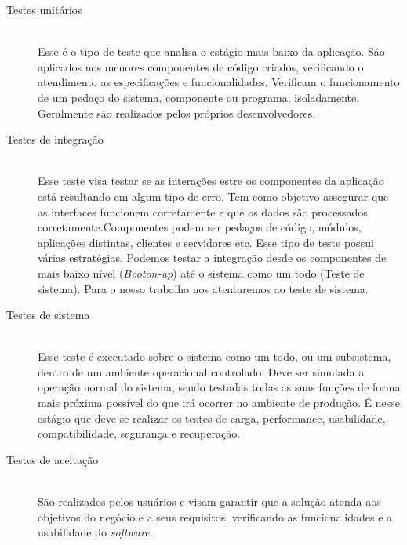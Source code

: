 \begin{description}
\item[Testes unitários] \hfill \\

Esse é o tipo de teste que analisa o estágio mais baixo da aplicação. São aplicados nos menores componentes de código criados, verificando o atendimento as especificações e funcionalidades. Verificam o funcionamento de um pedaço do sistema, componente ou programa,  isoladamente. Geralmente são realizados pelos próprios desenvolvedores.

\item[Testes de integração] \hfill \\

Esse teste visa testar se as interações estre os componentes da aplicação está resultando em algum tipo de erro. Tem como objetivo assegurar que as interfaces funcionem corretamente e que os dados são processados corretamente.Componentes podem ser pedaços de código, módulos, aplicações distintas, clientes e servidores etc. Esse tipo de teste possui várias estratégias. Podemos testar a integração desde os componentes de mais baixo nível (\textit{Booton-up})  até o sistema como um todo (Teste de sistema). Para o nosso trabalho nos atentaremos ao teste de sistema.

\item[Testes de sistema] \hfill \\

Esse teste é executado sobre o sistema como um todo, ou um subsistema, dentro de um ambiente operacional controlado. Deve ser simulada a operação normal do sistema, sendo testadas todas as suas funções de forma mais próxima possível do que irá ocorrer no ambiente de produção. É nesse estágio que deve-se realizar os testes de carga, performance, usabilidade, compatibilidade, segurança e recuperação.

\item[Testes de aceitação] \hfill \\

São realizados pelos usuários e visam garantir que a solução atenda aos objetivos do negócio e a seus requisitos, verificando as funcionalidades e a usabilidade do \textit{software}.
\end{description}

